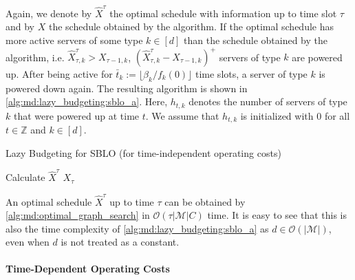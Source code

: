 Again, we denote by $\hat{X}^{\tau}$ the optimal schedule with information up to time slot $\tau$ and by $X$ the schedule obtained by the algorithm. If the optimal schedule has more active servers of some type $k \in [d]$ than the schedule obtained by the algorithm, i.e. $\hat{X}_{\tau,k}^{\tau} > X_{\tau-1,k}$, $(\hat{X}_{\tau,k}^{\tau} - X_{\tau-1,k})^+$ servers of type $k$ are powered up. After being active for $\bar{t}_k := \lfloor \beta_k / f_k(0) \rfloor$ time slots, a server of type $k$ is powered down again. The resulting algorithm is shown in \autoref{alg:md:lazy_budgeting:sblo_a}. Here, $h_{t,k}$ denotes the number of servers of type $k$ that were powered up at time $t$. We assume that $h_{t,k}$ is initialized with $0$ for all $t \in \mathbb{Z}$ and $k \in [d]$.

\begin{algorithm}
    \caption{Lazy Budgeting for SBLO (for time-independent operating costs) \cite{Albers2021_2}}\label{alg:md:lazy_budgeting:sblo_a}
    Calculate $\hat{X}^{\tau}$\;
    \Return $X_{\tau}$\;
\end{algorithm}

An optimal schedule $\hat{X}^{\tau}$ up to time $\tau$ can be obtained by \autoref{alg:md:optimal_graph_search} in $\mathcal{O}(\tau |\mathcal{M}| C)$ time. It is easy to see that this is also the time complexity of \autoref{alg:md:lazy_budgeting:sblo_a} as $d \in \mathcal{O}(|\mathcal{M}|)$, even when $d$ is not treated as a constant.

\paragraph{Time-Dependent Operating Costs}

